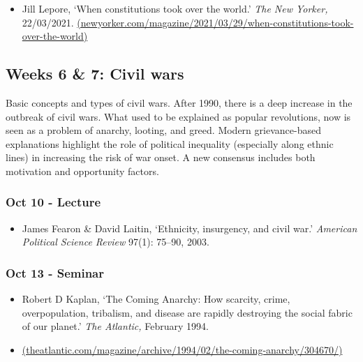 \documentclass[12pt, a4paper]{article}
\begin{document}
\begin{itemize}
\setlength\itemsep{0pt}
\item Jill Lepore, `When constitutions took over the world.' \textit{The New Yorker,} 22/03/2021. \href{https://www.newyorker.com/magazine/2021/03/29/when-constitutions-took-over-the-world}{(newyorker.com/magazine/2021/03/29/when-constitutions-took-over-the-world)}
\end{itemize}

\hline %

\subsection*{Weeks 6 \& 7: Civil wars}

Basic concepts and types of civil wars. After 1990, there is a deep increase in the outbreak of civil wars. What used to be explained as popular revolutions, now is seen as a problem of anarchy, looting, and greed. Modern grievance-based explanations highlight the role of political inequality (especially along ethnic lines) in increasing the risk of war onset. A new consensus includes both motivation and opportunity factors.

\subsubsection*{Oct 10 - Lecture}

\begin{itemize}
\setlength\itemsep{0pt}
\item James Fearon \& David Laitin, `Ethnicity, insurgency, and civil war.' \textit{American Political Science Review} 97(1): 75--90, 2003.
\end{itemize}

\subsubsection*{Oct 13 - Seminar}

\begin{itemize}
\setlength\itemsep{-5pt}
\item Robert D Kaplan, `The Coming Anarchy: How scarcity, crime, overpopulation, tribalism, and disease are rapidly destroying the social fabric of our planet.' \textit{The Atlantic,} February 1994.
\item[] \href{https://www.theatlantic.com/magazine/archive/1994/02/the-coming-anarchy/304670/}{(theatlantic.com/magazine/archive/1994/02/the-coming-anarchy/304670/)}
\end{itemize}
\end{document}
